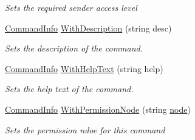 \begin{DoxyCompactItemize}
\begin{DoxyCompactList}\small\item\em Sets the required sender access level \end{DoxyCompactList}\item 
\hyperlink{classOTA_1_1Command_1_1CommandInfo}{Command\+Info} \hyperlink{classOTA_1_1Command_1_1CommandInfo_a6e3b30f45ea4a2a0af24b738854bcf9d}{With\+Description} (string desc)
\begin{DoxyCompactList}\small\item\em Sets the description of the command. \end{DoxyCompactList}\item 
\hyperlink{classOTA_1_1Command_1_1CommandInfo}{Command\+Info} \hyperlink{classOTA_1_1Command_1_1CommandInfo_af328c750c5496fda7f07678c3cbf755e}{With\+Help\+Text} (string help)
\begin{DoxyCompactList}\small\item\em Sets the help text of the command. \end{DoxyCompactList}\item 
\hyperlink{classOTA_1_1Command_1_1CommandInfo}{Command\+Info} \hyperlink{classOTA_1_1Command_1_1CommandInfo_a428eaf92bc7f1019122a08b02273b7b4}{With\+Permission\+Node} (string \hyperlink{classOTA_1_1Command_1_1CommandInfo_a90c46d7eb29ad8baa1281a134b56ab4c}{node})
\begin{DoxyCompactList}\small\item\em Sets the permission ndoe for this command \end{DoxyCompactList}\end{DoxyCompactItemize}
